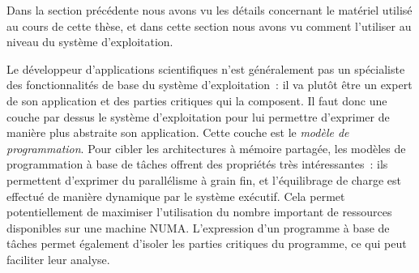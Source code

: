 \bigskip

Dans la section précédente nous avons vu les détails concernant le matériel utilisé au cours de cette thèse, et dans cette section nous avons vu comment l'utiliser au niveau du système d'exploitation.

Le développeur d'applications scientifiques n'est généralement pas un spécialiste des fonctionnalités de base du système d'exploitation~: il va plutôt être un expert de son application et des parties critiques qui la composent.
Il faut donc une couche par dessus le système d'exploitation pour lui permettre d'exprimer de manière plus abstraite son application. Cette couche est le \emph{modèle de programmation}.
Pour cibler les architectures à mémoire partagée, les modèles de programmation à base de tâches offrent des propriétés très intéressantes~: ils permettent d'exprimer du parallélisme à grain fin, et l'équilibrage de charge est effectué de manière dynamique par le système exécutif.
Cela permet potentiellement de maximiser l'utilisation du nombre important de ressources disponibles sur une machine NUMA.
L'expression d'un programme à base de tâches permet également d'isoler les parties critiques du programme, ce qui peut faciliter leur analyse.
